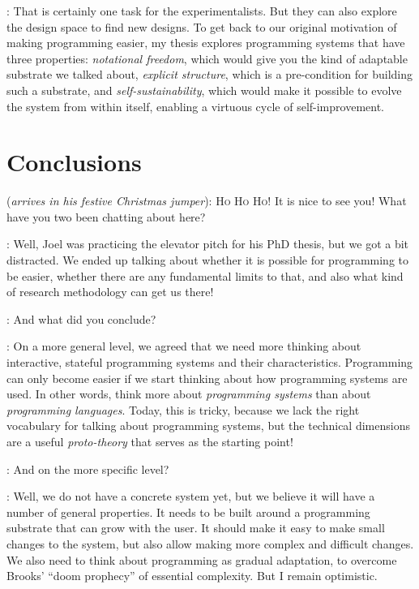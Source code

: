 \documentclass[runningheads]{llncs}
\newcommand{\T}{Tomas}
\newcommand{\J}{Joel}
\newcommand{\says}[2][gg]{\vspace{0.5em}\noindent\hangindent=0.5cm{\textsc{#1}}: #2}
\newcommand{\appears}[3][gg]{\vspace{0.5em}\noindent\hangindent=0.5cm{\textsc{#1}} (\emph{#2}): #3}
\begin{document}
\says[\J]{That is certainly one task for the experimentalists. But they can also explore the design space to find new designs. To get back to our original motivation of making programming easier, my thesis explores programming systems that have three properties: \emph{notational freedom}, which would give you the kind of adaptable substrate we talked about,
\emph{explicit structure}, which is a pre-condition for building such a substrate, and
\emph{self-sustainability}, which would make it possible to evolve the system from
within itself, enabling a virtuous cycle of self-improvement.}

\section{Conclusions}

\appears[Alan]{arrives in his festive Christmas jumper}{\textsc{Ho Ho Ho!} It is nice to see you! What have you two been chatting about here?}

\says[\T]{Well, Joel was practicing the elevator pitch for his PhD thesis, but we got a bit distracted. We ended up talking about whether it is possible for programming to be easier, whether there are any fundamental limits to that, and also what kind of research methodology can get us there!}

\says[Alan]{And what did you conclude?}

\says[\J]{On a more general level, we agreed that we need more thinking about interactive, stateful programming systems and their characteristics. Programming can only become easier if we start thinking about how programming systems are used. In other words, think more about \emph{programming systems} than about \emph{programming languages}. Today, this is tricky, because we lack the right vocabulary for talking about programming systems, but the technical dimensions are a useful \emph{proto-theory} that serves as the starting point!}

\says[Alan]{And on the more specific level?}

\says[\J]{Well, we do not have a concrete system yet, but we believe it will have a number of general properties. It needs to be built around a programming substrate that can grow with the user. It should make it easy to make small changes to the system, but also allow making more complex and difficult changes. We also need to think about programming as gradual adaptation, to overcome Brooks' ``doom prophecy'' of essential complexity. But I remain optimistic.}
\end{document}
